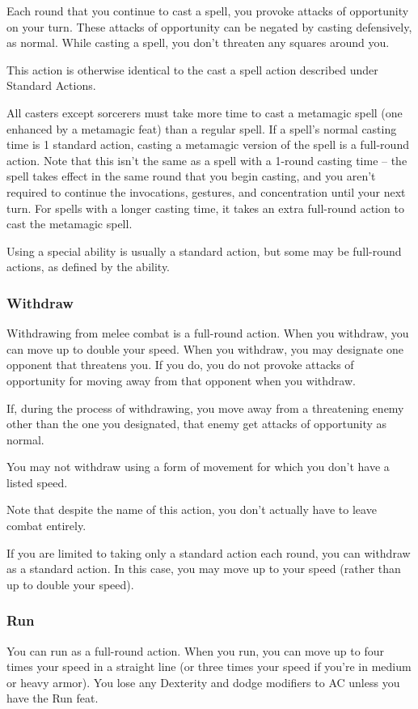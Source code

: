 Each round that you continue to cast a spell, you provoke attacks of opportunity on your turn. These attacks of opportunity can be negated by casting defensively, as normal. While casting a spell, you don't threaten any squares around you.

This action is otherwise identical to the cast a spell action described under Standard Actions.

 All casters except sorcerers must take more time to cast a metamagic spell (one enhanced by a metamagic feat) than a regular spell. If a spell's normal casting time is 1 standard action, casting a metamagic version of the spell is a full-round action. Note that this isn't the same as a spell with a 1-round casting time -- the spell takes effect in the same round that you begin casting, and you aren't required to continue the invocations, gestures, and concentration until your next turn. For spells with a longer casting time, it takes an extra full-round action to cast the metamagic spell.

Using a special ability is usually a standard action, but some may be full-round actions, as defined by the ability.

\subsubsection{Withdraw}
Withdrawing from melee combat is a full-round action. When you withdraw, you can move up to double your speed. When you withdraw, you may designate one opponent that threatens you. If you do, you do not provoke attacks of opportunity for moving away from that opponent when you withdraw.

If, during the process of withdrawing, you move away from a threatening enemy other than the one you designated, that enemy get attacks of opportunity as normal.

You may not withdraw using a form of movement for which you don't have a listed speed.

Note that despite the name of this action, you don't actually have to leave combat entirely.

 If you are limited to taking only a standard action each round, you can withdraw as a standard action. In this case, you may move up to your speed (rather than up to double your speed).

\subsubsection{Run}
You can run as a full-round action. When you run, you can move up to four times your speed in a straight line (or three times your speed if you're in medium or heavy armor). You lose any Dexterity and dodge modifiers to AC unless you have the Run feat.


